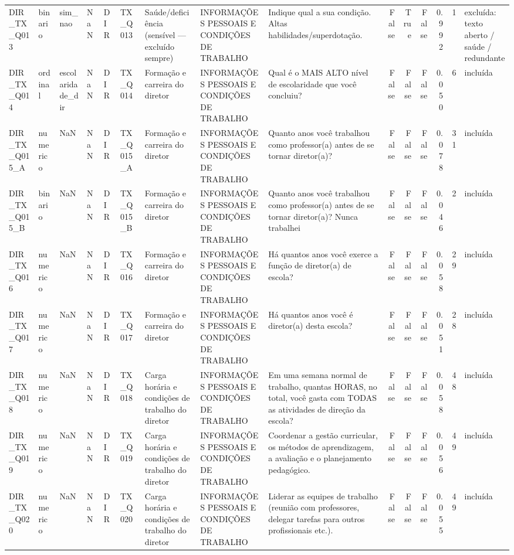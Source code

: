 \begin{tabular}{lllllllllrrrrrl}
DIR\_TX\_Q013 & binario & sim\_nao & NaN & DIR & TX\_Q013 & Saúde/deficiência (sensível — excluído sempre) & INFORMAÇÕES PESSOAIS E CONDIÇÕES DE TRABALHO & Indique qual a sua condição. Altas habilidades/superdotação. & False & True & False & 0.992 & 1 & excluída: texto aberto / saúde / redundante \\
DIR\_TX\_Q014 & ordinal & escolaridade\_dir & NaN & DIR & TX\_Q014 & Formação e carreira do diretor & INFORMAÇÕES PESSOAIS E CONDIÇÕES DE TRABALHO & Qual é o MAIS ALTO nível de escolaridade que você concluiu? & False & False & False & 0.050 & 6 & incluída \\
DIR\_TX\_Q015\_A & numerico & NaN & NaN & DIR & TX\_Q015\_A & Formação e carreira do diretor & INFORMAÇÕES PESSOAIS E CONDIÇÕES DE TRABALHO & Quanto anos você trabalhou como professor(a) antes de se tornar diretor(a)? & False & False & False & 0.078 & 31 & incluída \\
DIR\_TX\_Q015\_B & binario & NaN & NaN & DIR & TX\_Q015\_B & Formação e carreira do diretor & INFORMAÇÕES PESSOAIS E CONDIÇÕES DE TRABALHO & Quanto anos você trabalhou como professor(a) antes de se tornar diretor(a)? Nunca trabalhei & False & False & False & 0.046 & 2 & incluída \\
DIR\_TX\_Q016 & numerico & NaN & NaN & DIR & TX\_Q016 & Formação e carreira do diretor & INFORMAÇÕES PESSOAIS E CONDIÇÕES DE TRABALHO & Há quantos anos você exerce a função de diretor(a) de escola? & False & False & False & 0.058 & 29 & incluída \\
DIR\_TX\_Q017 & numerico & NaN & NaN & DIR & TX\_Q017 & Formação e carreira do diretor & INFORMAÇÕES PESSOAIS E CONDIÇÕES DE TRABALHO & Há quantos anos você é diretor(a) desta escola? & False & False & False & 0.051 & 28 & incluída \\
DIR\_TX\_Q018 & numerico & NaN & NaN & DIR & TX\_Q018 & Carga horária e condições de trabalho do diretor & INFORMAÇÕES PESSOAIS E CONDIÇÕES DE TRABALHO & Em uma semana normal de trabalho, quantas HORAS, no total, você gasta com TODAS as atividades de direção da escola? & False & False & False & 0.058 & 48 & incluída \\
DIR\_TX\_Q019 & numerico & NaN & NaN & DIR & TX\_Q019 & Carga horária e condições de trabalho do diretor & INFORMAÇÕES PESSOAIS E CONDIÇÕES DE TRABALHO & Coordenar a gestão curricular, os métodos de aprendizagem, a avaliação e o planejamento pedagógico. & False & False & False & 0.056 & 49 & incluída \\
DIR\_TX\_Q020 & numerico & NaN & NaN & DIR & TX\_Q020 & Carga horária e condições de trabalho do diretor & INFORMAÇÕES PESSOAIS E CONDIÇÕES DE TRABALHO & Liderar as equipes de trabalho (reunião com professores, delegar tarefas para outros profissionais etc.). & False & False & False & 0.055 & 49 & incluída \\

\end{tabular}
